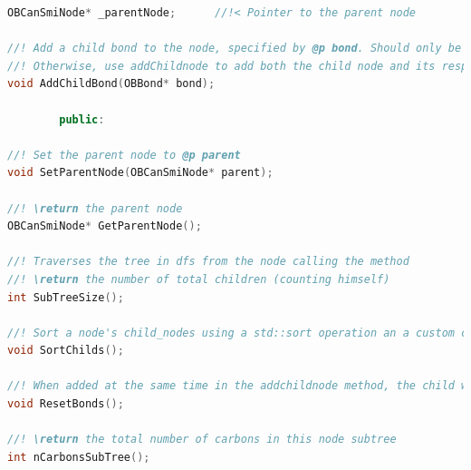 \begin{itemize}
\begin{lstlisting}[language=C++]
OBCanSmiNode* _parentNode;      //!< Pointer to the parent node

//! Add a child bond to the node, specified by @p bond. Should only be used in the ResetBonds method as a part of the OBMol2Cansmi::RearrangeTree algorithm.
//! Otherwise, use addChildnode to add both the child node and its respective bonds
void AddChildBond(OBBond* bond);

        public: 

//! Set the parent node to @p parent
void SetParentNode(OBCanSmiNode* parent);

//! \return the parent node
OBCanSmiNode* GetParentNode();

//! Traverses the tree in dfs from the node calling the method
//! \return the number of total children (counting himself) 
int SubTreeSize();

//! Sort a node's child_nodes using a std::sort operation an a custom comparator 'mycomp'
void SortChilds();

//! When added at the same time in the addchildnode method, the child with its bond have a 1 to 1 index correspondence. When reordering the children, in OBMol2Cansmi::RearrangeTree, the indices of the bonds are lost. This method clears and adds the bonds back in order.
void ResetBonds();

//! \return the total number of carbons in this node subtree
int nCarbonsSubTree();
    \end{lstlisting}

\end{itemize}





